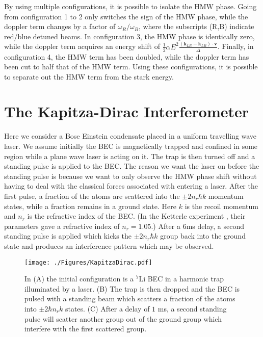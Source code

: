 By using multiple configurations, it is possible to isolate the HMW phase.  Going from configuration 1 to 2 only switches the sign of the HMW phase, while the doppler term changes by a factor of $\omega_R/\omega_B$, where the subscripts (R,B) indicate red/blue detuned beams.  In configuration 3, the HMW phase is identically zero, while the doppler term acquires an energy shift of $\frac{1}{2}\alpha E^2 \frac{\left(\mathbf{k}_{LR}-\mathbf{k}_{LB}\right)\cdot \mathbf{v}}{\Delta}$.  Finally, in configuration 4, the HMW term has been doubled, while the doppler term has been cut to half that of the HMW term.  Using these configurations, it is possible to separate out the HMW term from the stark energy.

\newpage
\section{The Kapitza-Dirac Interferometer}

Here we consider a Bose Einstein condensate placed in a uniform travelling wave laser.  We assume initially the BEC is magnetically trapped and confined in some region while a plane wave laser is acting on it.  The trap is then turned off and a standing pulse is applied to the BEC.  The reason we want the laser on before the standing pulse is because we want to only observe the HMW phase shift without having to deal with the classical forces associated with entering a laser.
After the first pulse, a fraction of the atoms are scattered into the $\pm 2n_r\hbar k$ momentum states, while a fraction remains in a ground state. Here $k$ is the recoil momentum and $n_r$ is the refractive index of the BEC.  (In the Ketterle experiment \cite{ketterle}, their parameters gave a refractive index of $n_r=1.05$.) After a $6$ms delay, a second standing pulse is applied which kicks the $\pm 2n_r\hbar k$ group back into the ground state and produces an interference pattern which may be observed. 
\begin{figure}[htp]
\texttt{[image: ./Figures/KapitzaDirac.pdf]}
\caption{In (A) the initial configuration is a ${}^{7}$Li BEC in a harmonic trap illuminated by a laser. (B) The trap is then dropped and the BEC is pulsed with a standing beam which scatters a fraction of the atoms into $\pm 2\hbar n_r k$ states.  (C) After a delay of $1$ ms, a second standing pulse will scatter another group out of the ground group which interfere with the first scattered group.} 
\label{fig:kapitz}
\end{figure}

